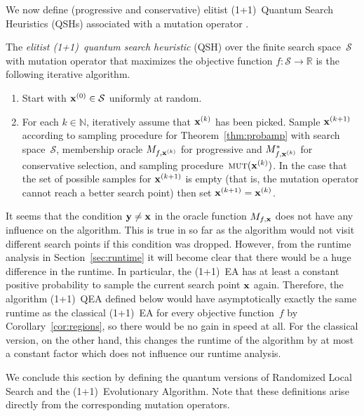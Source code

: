 \documentclass[a4paper,11pt]{article}
\begin{document}
We now define (progressive and conservative) elitist (1+1)~Quantum Search Heuristics (QSHs) associated with a mutation operator \mut.

\begin{samepage}
\begin{algorithm}[QSH]\label{algo:qsh}
The \emph{elitist (1+1)~quantum search heuristic} (QSH) over the finite search space~$\mathcal{S}$ with mutation operator \mut that maximizes the objective function $f:\mathcal{S}\to\mathbb{R}$ is the following iterative algorithm.
\begin{enumerate}
\item Start with $\xvec[0] \in \mathcal{S}$ uniformly at random.
\item For each $k\in\mathbb{N}$, iteratively assume that $\xvec[k]$ has been picked. Sample $\xvec[k+1]$ according to sampling procedure for Theorem~\ref{thm:probamp} with search space~$\mathcal{S}$, membership oracle $M_{f,\xvec[k]}$ for progressive and $M_{f,\xvec[k]}^*$ for conservative selection, and sampling procedure~$\mut(\xvec[k])$. In the case that the set of possible samples for $\xvec[k+1]$ is empty (that is, the mutation operator cannot reach a better search point) then set $\xvec[k+1]=\xvec[k]$.
\end{enumerate}
\end{algorithm}
\end{samepage}

It seems that the condition $\yvec \neq \xvec$ in the oracle function $M_{f,\xvec}$ does not have any influence on the algorithm. This is true in so far as the algorithm would not visit different search points if this condition was dropped. However, from the runtime analysis in Section~\ref{sec:runtime} it will become clear that there would be a huge difference in the runtime. In particular, the (1+1)~EA has at least a constant positive probability to sample the current search point $\xvec$ again. Therefore, the algorithm (1+1)~QEA defined below would have asymptotically exactly the same runtime as the classical (1+1)~EA for every objective function~$f$ by Corollary~\ref{cor:regions}, so there would be no gain in speed at all. For the classical version, on the other hand, this changes the runtime of the algorithm by at most a constant factor which does not influence our runtime analysis.

We conclude this section by defining the quantum versions of Randomized Local Search and the (1+1)~Evolutionary Algorithm. Note that these definitions arise directly from the corresponding mutation operators.
\end{document}
